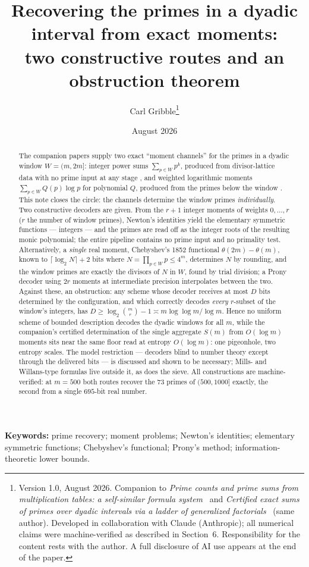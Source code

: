 \documentclass[11pt]{article}
\title{Recovering the primes in a dyadic interval from exact moments:\\
two constructive routes and an obstruction theorem}
\author{Carl Gribble\thanks{Version 1.0, August 2026. Companion to \emph{Prime counts and prime
sums from multiplication tables: a self-similar formula system}~\cite{CompanionI} and \emph{Certified
exact sums of primes over dyadic intervals via a ladder of generalized factorials}~\cite{CompanionII}
(same author). Developed in collaboration with Claude (Anthropic); all numerical claims were
machine-verified as described in Section~6. Responsibility for the content rests with the author. A full disclosure of AI use appears at the end of the paper.}}
\date{August 2026}
\theoremstyle{remark}
\begin{document}
\maketitle

\begin{abstract}
The companion papers supply two exact ``moment channels'' for the primes in a dyadic window
$W = (m, 2m]$: integer power sums $\sum_{p \in W} p^k$, produced from divisor-lattice data with no
prime input at any stage \cite{CompanionI}, and weighted logarithmic moments
$\sum_{p \in W} Q(p)\log p$ for polynomial $Q$, produced from the primes below the window
\cite{CompanionII}. This note closes the circle: the channels determine the window primes
\emph{individually}. Two constructive decoders are given. From the $r{+}1$ integer moments of weights
$0, \dots, r$ ($r$ the number of window primes), Newton's identities yield the elementary symmetric
functions --- integers --- and the primes are read off as the integer roots of the resulting monic
polynomial; the entire pipeline contains no prime input and no primality test. Alternatively, a
\emph{single} real moment, Chebyshev's 1852 functional $\theta(2m) - \theta(m)$, known to
$\lceil \log_2 N \rceil + 2$ bits where $N = \prod_{p \in W} p \le 4^m$, determines $N$ by rounding,
and the window primes are exactly the divisors of $N$ in $W$, found by trial division; a Prony decoder
using $2r$ moments at intermediate precision interpolates between the two. Against these, an
obstruction: any scheme whose decoder receives at most $D$ bits determined by the configuration, and
which correctly decodes \emph{every} $r$-subset of the window's integers, has
$D \ge \log_2 \binom{m}{r} - 1 \asymp m \log\log m / \log m$. Hence no uniform scheme of bounded
description decodes the dyadic windows for all $m$, while the companion's certified determination of
the single aggregate $S(m)$ from $O(\log m)$ moments sits near the same floor read at entropy
$O(\log m)$: one pigeonhole, two entropy scales. The model restriction --- decoders blind to number
theory except through the delivered bits --- is discussed and shown to be necessary; Mills- and
Willans-type formulas live outside it, as does the sieve. All constructions are machine-verified: at
$m = 500$ both routes recover the $73$ primes of $(500, 1000]$ exactly, the second from a single
$695$-bit real number.
\end{abstract}

\medskip
\noindent\textbf{Keywords:} prime recovery; moment problems; Newton's identities; elementary
symmetric functions; Chebyshev's functional; Prony's method; information-theoretic lower bounds.
\end{document}
